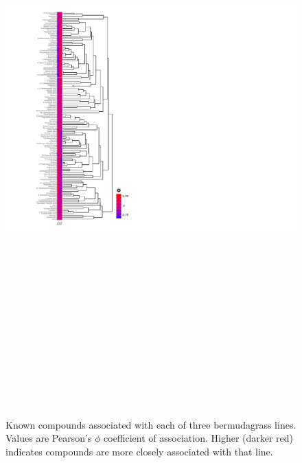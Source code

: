 \documentclass[9pt,lineno]{elife}
\begin{document}
\begin{figure}
\includegraphics[height = 9in]{figures/publication_figures/figure-3.pdf}
\caption{Known compounds associated with each of three bermudagrass lines.  Values are Pearson's $\phi$ coefficient of association.  Higher (darker red) indicates compounds are more closely associated with that line.  }
\label{fig:figure3}
\end{figure}
\end{document}

